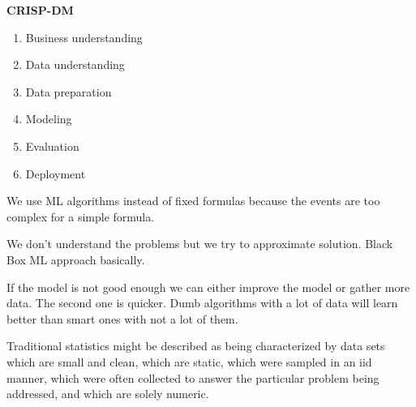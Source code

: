 \textbf{CRISP-DM}
\begin{enumerate}
    \item Business understanding
    \item Data understanding
    \item Data preparation
    \item Modeling
    \item Evaluation
    \item Deployment
\end{enumerate}



\vspace{10pt}


We use ML algorithms instead of fixed formulas because the events are too complex for a simple formula.

We don't understand the problems but we try to approximate solution. Black Box ML approach basically.

\vspace{10pt}

If the model is not good enough we can either improve the model or gather more data. The second one is quicker. Dumb algorithms with a lot of data will learn better than smart ones with not a lot of them.

\vspace{10pt}

Traditional statistics might be described as being characterized
by data sets which are small and clean, which are static,
which were sampled in an iid manner, which were often
collected to answer the particular problem being addressed,
and which are solely numeric.

